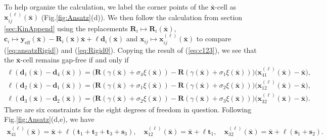 \documentclass[aps,11pt,tightenlines,notitlepage,superscriptaddress,longbibliography,nofootinbib]{revtex4-1}
\begin{document}
To help organize the calculation, we label the corner points of the $\bar{\mathbf{x}}$-cell as $\mathbf{x}_{ij}^{(\ell)}(\bar{\mathbf{x}})$ (Fig.\;\ref{fig:Ansatz}(d)). We then follow the calculation from section \ref{sec:KinAppend} using the replacements 
$\mathbf{R}_i \mapsto \mathbf{R}_i(\bar{\mathbf{x}})$, $\mathbf{c}_i \mapsto \mathbf{y}_{\text{eff}}(\bar{\mathbf{x}}) - \mathbf{R}_i(\bar{\mathbf{x}})\bar{\mathbf{x}} + \ell \mathbf{d}_{i}(\bar{\mathbf{x}})$ and $\mathbf{x}_{ij} \mapsto \mathbf{x}_{ij}^{(\ell)}(\bar{\mathbf{x}})$ to compare (\ref{eq:ansatzRigid}) and (\ref{eq:Rigid0}).
Copying the result of (\ref{eq:c123}), we see that the $\bar{\mathbf{x}}$-cell remains gap-free if and only if 
\begin{equation}
\begin{aligned}\label{eq:ciResults}
\ell ( \mathbf{d}_1(\bar{\mathbf{x}}) - \mathbf{d}_4(\bar{\mathbf{x}})) = \Big( \mathbf{R}(\gamma(\bar{\mathbf{x}}) + \sigma_4 \xi(\bar{\mathbf{x}})) -  \mathbf{R}(\gamma(\bar{\mathbf{x}}) + \sigma_1 \xi(\bar{\mathbf{x}})) \Big) \big( \mathbf{x}_{41}^{(\ell)}(\bar{\mathbf{x}})  - \bar{\mathbf{x}}\big), \\
\ell ( \mathbf{d}_2(\bar{\mathbf{x}}) - \mathbf{d}_1(\bar{\mathbf{x}})) = \Big( \mathbf{R}(\gamma(\bar{\mathbf{x}}) + \sigma_1 \xi(\bar{\mathbf{x}})) -  \mathbf{R}(\gamma(\bar{\mathbf{x}}) + \sigma_2 \xi(\bar{\mathbf{x}})) \Big) \big( \mathbf{x}_{12}^{(\ell)}(\bar{\mathbf{x}})  - \bar{\mathbf{x}}\big), \\
\ell ( \mathbf{d}_3(\bar{\mathbf{x}}) - \mathbf{d}_2(\bar{\mathbf{x}})) = \Big( \mathbf{R}(\gamma(\bar{\mathbf{x}}) + \sigma_2 \xi(\bar{\mathbf{x}})) -  \mathbf{R}(\gamma(\bar{\mathbf{x}}) + \sigma_3 \xi(\bar{\mathbf{x}})) \Big) \big( \mathbf{x}_{32}^{(\ell)}(\bar{\mathbf{x}})  - \bar{\mathbf{x}}\big).
\end{aligned}
\end{equation}
There are six constraints for the eight degrees of freedom in question. Following Fig.\;\ref{fig:Ansatz}(d,e), we have 
\begin{equation}
\begin{aligned}\label{eq:xijParams}
\mathbf{x}^{(\ell)}_{41}(\bar{\mathbf{x}}) = \bar{\mathbf{x}} + \ell(\mathbf{t}_1 + \mathbf{t}_2 + \mathbf{t}_3 + \mathbf{s}_3), \quad \mathbf{x}^{(\ell)}_{12}(\bar{\mathbf{x}}) = \bar{\mathbf{x}} + \ell \mathbf{t}_1, \quad \mathbf{x}^{(\ell)}_{32}(\bar{\mathbf{x}}) = \bar{\mathbf{x}} + \ell ( \mathbf{s}_1 + \mathbf{s}_2).
\end{aligned}
\end{equation}
\end{document}
